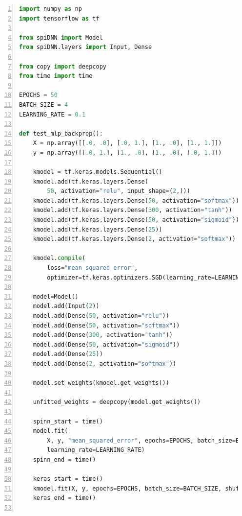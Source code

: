 \documentclass[]{article}
\begin{document}
\begin{appendices}
\newpage

\begin{lstlisting}[language=Python, caption={Excerpt from the test
  suite showing a network similar to the MLP from
  Listing~\ref{lst:big_models_inference} being trained.
  The MLP is trained to learn XOR, so the input and output dimensions
  are different from the model shown in
  Listing~\ref{lst:big_models_inference}.
  The backward pass was implemented using shared parameters
  (see Section~\ref{subsec:problems}).}, captionpos=b, numbers=left,
  label={lst:big_mlp_training}]
import numpy as np
import tensorflow as tf

from spiDNN import Model
from spiDNN.layers import Input, Dense

from copy import deepcopy
from time import time

EPOCHS = 50
BATCH_SIZE = 4
LEARNING_RATE = 0.1

def test_mlp_backprop():
    X = np.array([[.0, .0], [.0, 1.], [1., .0], [1., 1.]])
    y = np.array([[.0, 1.], [1., .0], [1., .0], [.0, 1.]])

    kmodel = tf.keras.models.Sequential()
    kmodel.add(tf.keras.layers.Dense(
        50, activation="relu", input_shape=(2,)))
    kmodel.add(tf.keras.layers.Dense(50, activation="softmax"))
    kmodel.add(tf.keras.layers.Dense(300, activation="tanh"))
    kmodel.add(tf.keras.layers.Dense(50, activation="sigmoid"))
    kmodel.add(tf.keras.layers.Dense(25))
    kmodel.add(tf.keras.layers.Dense(2, activation="softmax"))

    kmodel.compile(
        loss="mean_squared_error",
        optimizer=tf.keras.optimizers.SGD(learning_rate=LEARNING_RATE))

    model=Model()
    model.add(Input(2))
    model.add(Dense(50, activation="relu"))
    model.add(Dense(50, activation="softmax"))
    model.add(Dense(300, activation="tanh"))
    model.add(Dense(50, activation="sigmoid"))
    model.add(Dense(25))
    model.add(Dense(2, activation="softmax"))

    model.set_weights(kmodel.get_weights())

    unfitted_weights = deepcopy(model.get_weights())

    spinn_start = time()
    model.fit(
        X, y, "mean_squared_error", epochs=EPOCHS, batch_size=BATCH_SIZE,
        learning_rate=LEARNING_RATE)
    spinn_end = time()

    keras_start = time()
    kmodel.fit(X, y, epochs=EPOCHS, batch_size=BATCH_SIZE, shuffle=False)
    keras_end = time()


\end{lstlisting}
\end{appendices}
\end{document}
